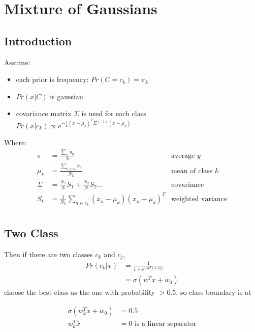 \documentclass[]{article}
\theoremstyle{definition}
\begin{document}
    \section{Mixture of Gaussians}
    \label{sec:mixture_of_gaussians}

    \subsection{Introduction}
    Assume:
    \begin{itemize}
        \item each prior is frequency: $Pr(C = c_k) = \pi_k$
        \item $Pr(x|C)$ is gaussian
        \item covariance matrix $\Sigma$ is used for each class $Pr(x|c_k) \propto e^{- \frac{1}{2} (x-\mu_k)^T \Sigma^(-1) (x - \mu_k)}$
    \end{itemize}

    Where:
    \begin{align*}
        \pi    &= \frac{\sum_n y_n}{N}             &\text{average } y \\
        \mu_k  &= \frac{\sum_{n \in c_k} x_n}{N_k} &\text{mean of class } k \\
        \Sigma &= \frac{N_1}{N} S_1 + \frac{N_2}{N} S_2 \ldots &\text{covariance} \\
        S_k    &= \frac{1}{N_k} \sum_{n \in c_k} (x_n - \mu_k)(x_n - \mu_k)^T &\text{weighted variance}\\
    \end{align*}

    \subsection{Two Class}
    \label{sub:two_class}
    
    Then if there are two classes $c_k$ and $c_j$,
    \begin{align*}
    Pr(c_k|x) &= \frac{1}{1 + e^{-w^T x + w_0)}} \\
              &= \sigma (w^Tx + w_0)
    \end{align*}
    choose the best class as the one with probability $> 0.5$, so class boundary is at 

    \begin{align*}
        \sigma (w^T_k x + w_0) &= 0.5 \\
        w^T_k \bar x &= 0 \text{ is a linear separator}
    \end{align*}
    
\end{document}
